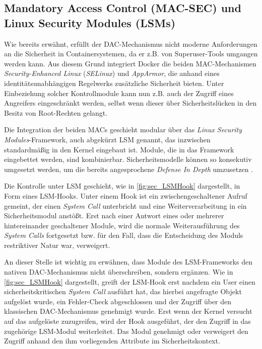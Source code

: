 \documentclass[../main.tex]{subfiles}
\begin{document}
{			%

    \subsection{Mandatory Access Control (\acrshort{MAC-SEC}) und Linux Security Modules (\acrshort{LSM}s)}
		\label{lsm}
			Wie bereits erwähnt, erfüllt der DAC-Mechanismus nicht moderne Anforderungen an die Sicherheit in Containersystemen, da er z.B. von Superuser-Tools umgangen werden kann. Aus diesem Grund integriert Docker die beiden MAC-Mechanismen \emph{Security-Enhanced Linux} (\emph{SELinux}) und \emph{AppArmor}, die anhand eines identitätsunabhängigen Regelwerks zusätzliche Sicherheit bieten. Unter Einbeziehung solcher Kontrollmodule kann nun z.B. auch der Zugriff eines Angreifers eingeschränkt werden, selbst wenn dieser über Sicherheitslücken in den Besitz von Root-Rechten gelangt.

			Die Integration der beiden MACs geschieht modular über das \emph{Linux Security Modules}-Framework, auch abgekürzt \acrshort{LSM} genannt, das inzwischen standardmäßig in den Kernel eingebaut ist. Module, die in das Framework eingebettet werden, sind kombinierbar. Sicherheitsmodelle können so konsekutiv umgesetzt werden, um die bereits angesprochene \emph{Defense In Depth} umzusetzen \cite[S.3]{LSMFramework}.

			Die Kontrolle unter LSM geschieht, wie in \fig \ref{fig:sec_LSMHook} dargestellt, in Form eines LSM-Hooks. Unter einem Hook ist ein zwischengeschaltener Aufruf gemeint, der einen \emph{System Call} unterbricht und eine Weiterverarbeitung in ein Sicherheitsmodul anstößt. Erst nach einer Antwort eines oder mehrerer hintereinander geschaltener Module, wird die normale Weiterausführung des \emph{System Calls} fortgesetzt bzw. für den Fall, dass die Entscheidung des Moduls restriktiver Natur war, verweigert.

			An dieser Stelle ist wichtig zu erwähnen, dass Module des LSM-Frameworks den nativen DAC-Mechanismus nicht überschreiben, sondern ergänzen. Wie in \fig \ref{fig:sec_LSMHook} dargestellt, greift der LSM-Hook erst nachdem ein User einen sicherheitskritischen \emph{System Call} ausführt hat, das hierbei angefragte Objekt aufgelöst wurde, ein Fehler-Check abgeschlossen und der Zugriff über den klassischen DAC-Mechanismus genehmigt wurde. Erst wenn der Kernel versucht auf das aufgelöste  zuzugreifen, wird der Hook ausgeführt, der den Zugriff in das zugehörige LSM-Modul weiterleitet. Das Modul genehmigt oder verweigert den Zugriff anhand den ihm vorliegenden Attribute im Sicherheitskontext.

}
\end{document}
